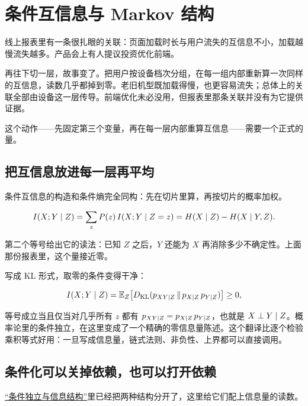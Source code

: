 \section{条件互信息与 Markov 结构}
\label{sec:07-Information-Theory/02-Joint-Information/03}

线上报表里有一条很扎眼的关联：页面加载时长与用户流失的互信息不小，加载越慢流失越多。产品会上有人提议投资优化前端。

再往下切一层，故事变了。把用户按设备档次分组，在每一组内部重新算一次同样的互信息，读数几乎都掉到零。老旧机型既加载得慢，也更容易流失；总体上的关联全部由设备这一层传导。前端优化未必没用，但报表里那条关联并没有为它提供证据。

这个动作——先固定第三个变量，再在每一层内部重算互信息——需要一个正式的量。

\subsection{把互信息放进每一层再平均}

条件互信息的构造和条件熵完全同构：先在切片里算，再按切片的概率加权。

\[
I(X;Y\mid Z)=\sum_z P(z)\,I(X;Y\mid Z=z)=H(X\mid Z)-H(X\mid Y,Z).
\]

第二个等号给出它的读法：已知 \(Z\) 之后，\(Y\) 还能为 \(X\) 再消除多少不确定性。上面那份报表里，这个量接近零。

写成 KL 形式，取零的条件变得干净：

\[
I(X;Y\mid Z)=\mathbb{E}_Z\bigl[D_{\mathrm{KL}}(p_{XY\mid Z}\,\|\,p_{X\mid Z}\,p_{Y\mid Z})\bigr]\ge 0,
\]

等号成立当且仅当对几乎所有 \(z\) 都有 \(p_{XY\mid Z}=p_{X\mid Z}\,p_{Y\mid Z}\)，也就是 \(X\perp Y\mid Z\)。概率论里的条件独立，在这里变成了一个精确的零信息量陈述。这个翻译比逐个检验乘积等式好用：一旦写成信息量，链式法则、非负性、上界都可以直接调用。

\subsection{条件化可以关掉依赖，也可以打开依赖}

\hyperref[sec:05-Probability/02-Conditional-Probability/04]{``条件独立与信息结构''}里已经把两种结构分开了，这里给它们配上信息量的读数。


